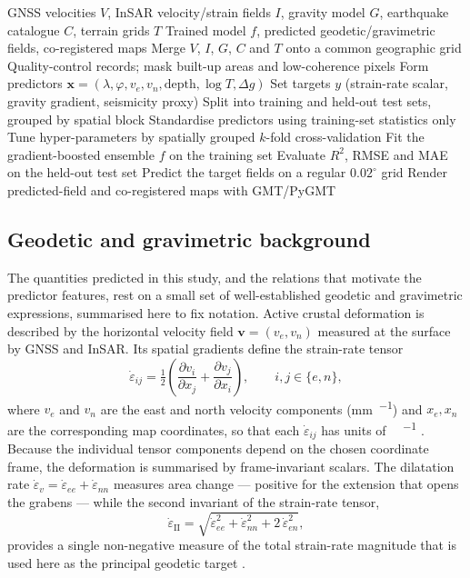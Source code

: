 \documentclass[pdflatex,sn-mathphys-num]{sn-jnl}%
\theoremstyle{thmstyleone}%
\theoremstyle{thmstyletwo}%
\theoremstyle{thmstylethree}%
\begin{document}
\begin{algorithm}
\caption{End-to-end geodetic-field prediction and mapping pipeline.}\label{alg:pipeline}
\begin{algorithmic}[1]
\Require GNSS velocities $V$, InSAR velocity/strain fields $I$, gravity model $G$, earthquake catalogue $C$, terrain grids $T$
\Ensure Trained model $f$, predicted geodetic/gravimetric fields, co-registered maps
\State Merge $V$, $I$, $G$, $C$ and $T$ onto a common geographic grid
\State Quality-control records; mask built-up areas and low-coherence pixels
\State Form predictors $\mathbf{x}=(\lambda,\varphi,v_e,v_n,\text{depth},\log T,\Delta g)$
\State Set targets $y$ (strain-rate scalar, gravity gradient, seismicity proxy)
\State Split into training and held-out test sets, grouped by spatial block
\State Standardise predictors using training-set statistics only
\State Tune hyper-parameters by spatially grouped $k$-fold cross-validation
\State Fit the gradient-boosted ensemble $f$ on the training set
\State Evaluate $R^2$, RMSE and MAE on the held-out test set
\State Predict the target fields on a regular $0.02^{\circ}$ grid
\State Render predicted-field and co-registered maps with GMT/PyGMT
\end{algorithmic}
\end{algorithm}

\subsection{Geodetic and gravimetric background}\label{sec:geobg}
The quantities predicted in this study, and the relations that motivate the predictor
features, rest on a small set of well-established geodetic and gravimetric
expressions, summarised here to fix notation. Active crustal deformation is described
by the horizontal velocity field $\mathbf{v}=(v_e,v_n)$ measured at the surface by
GNSS and InSAR. Its spatial gradients define the strain-rate tensor
\begin{equation}
\dot{\varepsilon}_{ij}=\tfrac{1}{2}\!\left(\frac{\partial v_i}{\partial x_j}+\frac{\partial v_j}{\partial x_i}\right),
\qquad i,j\in\{e,n\},
\label{eq:strain}
\end{equation}
where $v_e$ and $v_n$ are the east and north velocity components
(\si{\milli\metre\per\year}) and $x_e,x_n$ are the corresponding map coordinates, so
that each $\dot{\varepsilon}_{ij}$ has units of \si{\nano\strain\per\year}
\cite{England2016,Weiss2020,Kreemer2003,Hollenstein2008}. Because the individual tensor components depend on the
chosen coordinate frame, the deformation is summarised by frame-invariant scalars. The
dilatation rate $\dot{\varepsilon}_{v}=\dot{\varepsilon}_{ee}+\dot{\varepsilon}_{nn}$
measures area change --- positive for the extension that opens the grabens --- while
the second invariant of the strain-rate tensor,
\begin{equation}
\dot{\varepsilon}_{\mathrm{II}}=\sqrt{\dot{\varepsilon}_{ee}^{2}+\dot{\varepsilon}_{nn}^{2}+2\,\dot{\varepsilon}_{en}^{2}},
\label{eq:invariant}
\end{equation}
provides a single non-negative measure of the total strain-rate magnitude that is used
here as the principal geodetic target \cite{Hussain2018,Kurt2023,Ergintav2023}.
\end{document}
